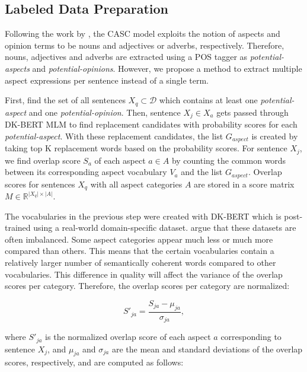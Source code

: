 \documentclass[american, oneside]{ecsgdp}
\begin{document}
\subsection{Labeled Data Preparation}
Following the work by \textcite{Hu2004Rules}, the CASC model exploits the notion of aspects and opinion terms to be nouns and adjectives or adverbs, respectively. Therefore, nouns, adjectives and adverbs are extracted using a POS tagger as \textit{potential-aspects} and \textit{potential-opinions}. However, we propose a method to extract multiple aspect expressions per sentence instead of a single term.

First, find the set of all sentences $X_q \subset \mathcal{D}$ which contains at least one \textit{potential-aspect} and one \textit{potential-opinion}. Then, sentence $X_j \in X_a$ gets passed through DK-BERT MLM to find replacement candidates with probability scores for each \textit{potential-aspect}. With these replacement candidates, the list $G_{aspect}$ is created by taking top K replacement words based on the probability scores. For sentence $X_j$, we find overlap score $S_a$ of each aspect $a \in A$ by counting the common words between its corresponding aspect vocabulary $V_a$ and the list $G_{aspect}$. Overlap scores for sentences $X_q$ with all aspect categories $A$ are stored in a score matrix $M \in \mathbb{R}^{\lvert X_q \rvert \times \lvert A \rvert}$.


The vocabularies in the previous step were created with DK-BERT which is post-trained using a real-world domain-specific dataset. \textcite{Kumar2021CASC} argue that these datasets are often imbalanced. Some aspect categories appear much less or much more compared than others. This means that the certain vocabularies contain a relatively larger number of semantically coherent words compared to other vocabularies. This difference in quality will affect the variance of the overlap scores per category. Therefore, the overlap scores per category are normalized:

\begin{equation}
    S'_{ja} = \frac{S_{ja} - \mu_{ja}}{\sigma_{ja}},
\end{equation}

\noindent where $S'_{ja}$ is the normalized overlap score of each aspect $a$ corresponding to sentence $X_j$, and $\mu_{ja}$ and $\sigma_{ja}$ are the mean and standard deviations of the overlap scores, respectively, and are computed as follows:
\end{document}
